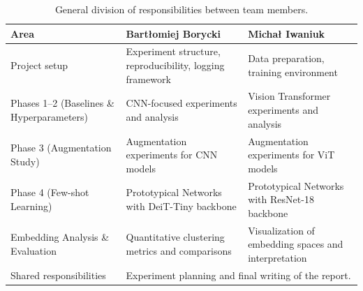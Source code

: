 \documentclass[12pt,a4paper]{article}
\begin{document}
\begin{table}[H]
\centering
\caption{General division of responsibilities between team members.}
\label{tab:responsibilities}
\begin{tabular}{@{}p{}p{}p{}@{}}
\toprule
\textbf{Area} & \textbf{Bart\l{}omiej Borycki} & \textbf{Micha\l{} Iwaniuk} \\
\midrule

Project setup
& Experiment structure, reproducibility, logging framework
& Data preparation, training environment \\

\addlinespace

Phases 1--2 (Baselines \& Hyperparameters)
& CNN-focused experiments and analysis
& Vision Transformer experiments and analysis \\

\addlinespace

Phase 3 (Augmentation Study)
& Augmentation experiments for CNN models
& Augmentation experiments for ViT models \\

\addlinespace

Phase 4 (Few-shot Learning)
& Prototypical Networks with DeiT-Tiny backbone 
& Prototypical Networks with ResNet-18 backbone \\

\addlinespace

Embedding Analysis \& Evaluation
& Quantitative clustering metrics and comparisons
& Visualization of embedding spaces and interpretation \\

\addlinespace

\midrule
Shared responsibilities
& \multicolumn{2}{p{0.64\textwidth}}{Experiment planning and final writing of the report.} \\
\bottomrule
\end{tabular}
\end{table}
\end{document}
